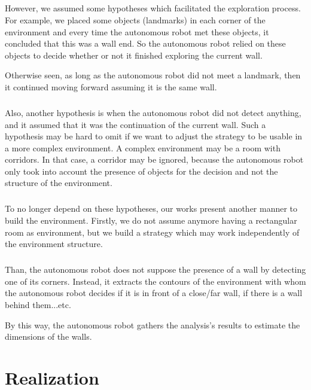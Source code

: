 \documentclass[12pt]{report}
\begin{document}
	\paragraph{}
	However, we assumed some hypotheses which facilitated the exploration process. For example, we placed some objects (landmarks) in each corner of the environment and every time the autonomous robot met these objects, it concluded that this was a wall end. So the autonomous robot relied on these objects to decide whether or not it finished exploring the current wall.
	
	Otherwise seen, as long as the autonomous robot did not meet a landmark, then it continued moving forward assuming it is the same wall.
	
	\paragraph{}
	Also, another hypothesis is when the autonomous robot did not detect anything, and it assumed that it was the continuation of the current wall. Such a hypothesis may be hard to omit if we want to adjust the strategy to be usable in a more complex environment. A complex environment may be a room with corridors. In that case, a corridor may be ignored, because the autonomous robot only took into account the presence of objects for the decision and not the structure of the environment.
	
	\paragraph{}
	To no longer depend on these hypotheses, our works present another manner to build the environment. Firstly, we do not assume anymore having a rectangular room as environment, but we build a strategy which may work independently of the environment structure. 
	\paragraph{}
	Than, the autonomous robot does not suppose the presence of a wall by detecting one of its corners. Instead, it extracts the contours of the environment with whom the autonomous robot decides if it is in front of a close/far wall, if there is a wall behind them...etc.
	
	By this way, the autonomous robot gathers the analysis's results to estimate the dimensions of the walls.
	
    \chapter{Realization}
\end{document}
